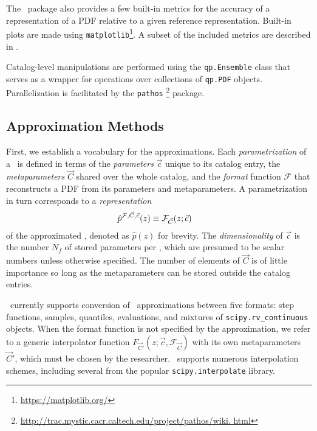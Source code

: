 The \qp\ package also provides a few built-in metrics for the accuracy of a 
representation of a PDF relative to a given reference representation.
Built-in plots are made using 
\texttt{matplotlib}\footnote{\url{https://matplotlib.org/}}.
A subset of the included metrics are described in .

Catalog-level manipulations are performed using the \texttt{qp.Ensemble} class 
that serves as a wrapper for operations over collections of \texttt{qp.PDF} 
objects.
Parallelization is facilitated by the \texttt{pathos} 
\footnote{\noindent\url{http://trac.mystic.cacr.caltech.edu/project/pathos/wiki.
		html}} \citep{mckerns_building_2012, mckerns_pathos:_2010} package.

\subsection{Approximation Methods}

First, we establish a vocabulary for the approximations.
Each \textit{parametrization} of a \pz\ is defined in terms of the 
\textit{parameters} $\vec{c}$ unique to its catalog entry, the 
\textit{metaparameters} $\vec{C}$ shared over the whole catalog, and the 
\textit{format} function $\mathcal{F}$ that reconstructs a PDF from its 
parameters and metaparameters.
A parametrization in turn corresponds to a \textit{representation}
\begin{align}
\eqlabel{eq:definition}
\hat{p}^{\mathcal{F}, \vec{C}, \vec{c}}(z) &\equiv \mathcal{F}_{\vec{C}}(z; 
\vec{c})
\end{align}
of the approximated \pz, denoted as $\hat{p}(z)$ for brevity.
The \textit{dimensionality} of $\vec{c}$ is the number $N_{f}$ of stored 
parameters per \pz, which are presumed to be scalar numbers unless otherwise 
specified.
The number of elements of $\vec{C}$ is of little importance so long as the 
metaparameters can be stored outside the catalog entries.

\qp\ currently supports conversion of \pz\ approximations between five formats: 
step functions, samples, quantiles, evaluations, and mixtures of 
\texttt{scipy.rv\_continuous} objects.
When the format function is not specified by the approximation, we refer to a 
generic interpolator function $F_{\vec{C}'}(z; \vec{c}, \mathcal{F}_{\vec{C}})$ 
with its own metaparameters $\vec{C}'$, which must be chosen by the researcher.
\qp\ supports numerous interpolation schemes, including several from the 
popular \texttt{scipy.interpolate} library.

